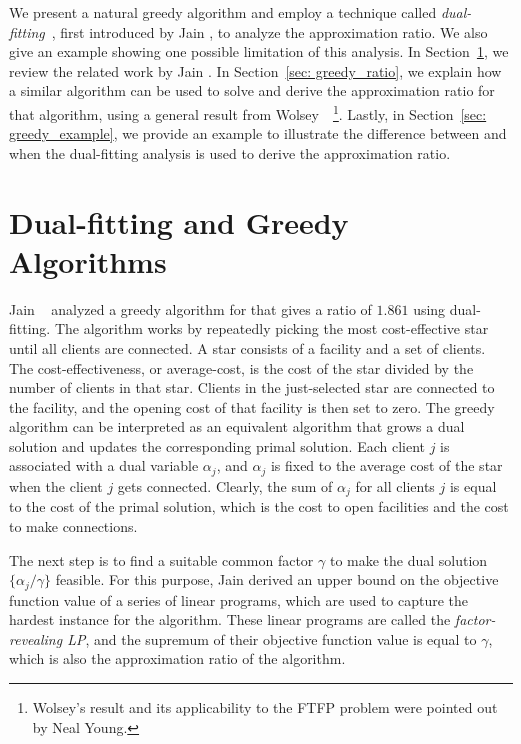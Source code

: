 \documentclass[oneside,final]{ucr}
\begin{document}
We present a natural greedy algorithm and employ a technique
called \emph{dual-fitting}~\cite{JainMMSV03}, first
introduced by Jain {\etal}, to analyze the approximation
ratio. We also give an example showing one possible
limitation of this analysis.  In Section~\ref{sec: greedy},
we review the related work by Jain {\etal}.  In
Section~\ref{sec: greedy_ratio}, we explain how a similar
algorithm can be used to solve {\FTFP} and derive the
approximation ratio for that algorithm, using a general
result from Wolsey~\cite{Wolsey88}~\footnote{Wolsey's result
  and its applicability to the FTFP problem were pointed out
  by Neal Young.}. Lastly, in Section~\ref{sec:
  greedy_example}, we provide an example to illustrate the
difference between {\UFL} and {\FTFP} when the dual-fitting
analysis is used to derive the approximation ratio.

\section{Dual-fitting and Greedy Algorithms}
\label{sec: greedy}

Jain {\etal}~\cite{JainMMSV03} analyzed a greedy algorithm
for {\UFL} that gives a ratio of $1.861$ using
dual-fitting. The algorithm works by repeatedly picking the
most cost-effective star until all clients are connected. A
star consists of a facility and a set of clients. The
cost-effectiveness, or average-cost, is the cost of the star
divided by the number of clients in that star. Clients in
the just-selected star are connected to the facility, and
the opening cost of that facility is then set to zero. The
greedy algorithm can be interpreted as an equivalent
algorithm that grows a dual solution and updates the
corresponding primal solution. Each client $j$ is associated
with a dual variable $\alpha_j$, and $\alpha_j$ is fixed to
the average cost of the star when the client $j$ gets
connected. Clearly, the sum of $\alpha_j$ for all clients
$j$ is equal to the cost of the primal solution, which is
the cost to open facilities and the cost to make
connections.

The next step is to find a suitable common factor $\gamma$
to make the dual solution $\{\alpha_j / \gamma\}$
feasible. For this purpose, Jain {\etal} derived an upper
bound on the objective function value of a series of linear
programs, which are used to capture the hardest instance for
the algorithm. These linear programs are called the
\emph{factor-revealing LP}, and the supremum of their
objective function value is equal to $\gamma$, which is also
the approximation ratio of the algorithm.
\end{document}
